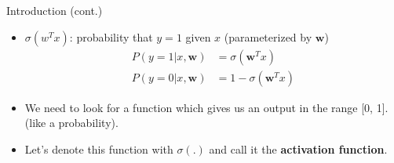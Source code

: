 \documentclass[serif, aspectratio=169]{beamer}
\begin{document}
\begin{frame}{Introduction (cont.)}
    \begin{itemize}
        \item $\sigma (w^Tx)$: probability that $y=1$ given $x$ (parameterized by \textbf{$\textbf{w}$})
      \begin{align*}
        P(y=1|x,\mathbf{w}) &= \sigma (\mathbf{w}^Tx) \\
        P(y=0|x,\mathbf{w}) &= 1 - \sigma (\mathbf{w}^Tx)
      \end{align*}

        \item We need to look for a function which gives us an output in the range [0, 1]. (like a probability).

        \item Let's denote this function with $\sigma (.)$ and call it the \textbf{activation function}.
        
    \end{itemize}
\end{frame}
\end{document}
